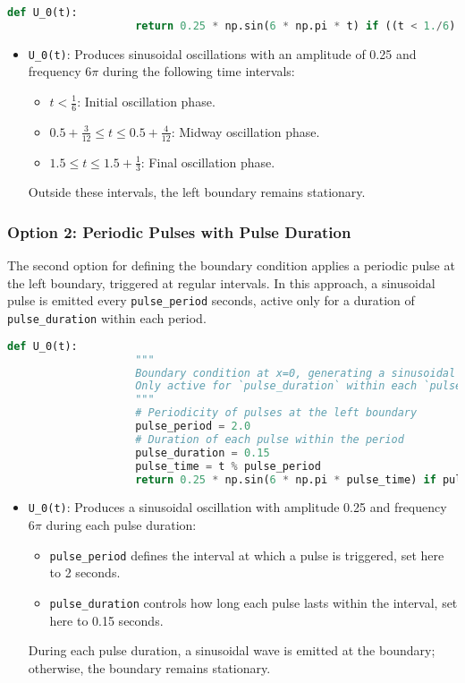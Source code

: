 \documentclass{article}
\begin{document}
			\begin{lstlisting}[language=Python]
				def U_0(t):
					return 0.25 * np.sin(6 * np.pi * t) if ((t < 1./6) or (0.5 + 3./12 <= t <= 0.5 + 4./12) or (1.5 <= t <= 1.5 + 1./3)) else 0
			\end{lstlisting}
			
			\begin{itemize}
				\item \texttt{U\_0(t)}: Produces sinusoidal oscillations with an amplitude of 0.25 and frequency \(6 \pi\) during the following time intervals:
				\begin{itemize}
					\item \( t < \frac{1}{6} \): Initial oscillation phase.
					\item \( 0.5 + \frac{3}{12} \leq t \leq 0.5 + \frac{4}{12} \): Midway oscillation phase.
					\item \( 1.5 \leq t \leq 1.5 + \frac{1}{3} \): Final oscillation phase.
				\end{itemize}
				Outside these intervals, the left boundary remains stationary.
			\end{itemize}
			
			\subsubsection{Option 2: Periodic Pulses with Pulse Duration}
			
			The second option for defining the boundary condition applies a periodic pulse at the left boundary, triggered at regular intervals. In this approach, a sinusoidal pulse is emitted every \texttt{pulse\_period} seconds, active only for a duration of \texttt{pulse\_duration} within each period.
			
			\begin{lstlisting}[language=Python]
				def U_0(t):
					"""
					Boundary condition at x=0, generating a sinusoidal pulse at regular intervals.
					Only active for `pulse_duration` within each `pulse_period`.
					"""
					# Periodicity of pulses at the left boundary
					pulse_period = 2.0
					# Duration of each pulse within the period
					pulse_duration = 0.15
					pulse_time = t % pulse_period
					return 0.25 * np.sin(6 * np.pi * pulse_time) if pulse_time <= pulse_duration else 0
			\end{lstlisting}
			
			\begin{itemize}
				\item \texttt{U\_0(t)}: Produces a sinusoidal oscillation with amplitude 0.25 and frequency \(6 \pi\) during each pulse duration:
				\begin{itemize}
					\item \texttt{pulse\_period} defines the interval at which a pulse is triggered, set here to 2 seconds.
					\item \texttt{pulse\_duration} controls how long each pulse lasts within the interval, set here to 0.15 seconds.
				\end{itemize}
				During each pulse duration, a sinusoidal wave is emitted at the boundary; otherwise, the boundary remains stationary.
			\end{itemize}
			
\end{document}
